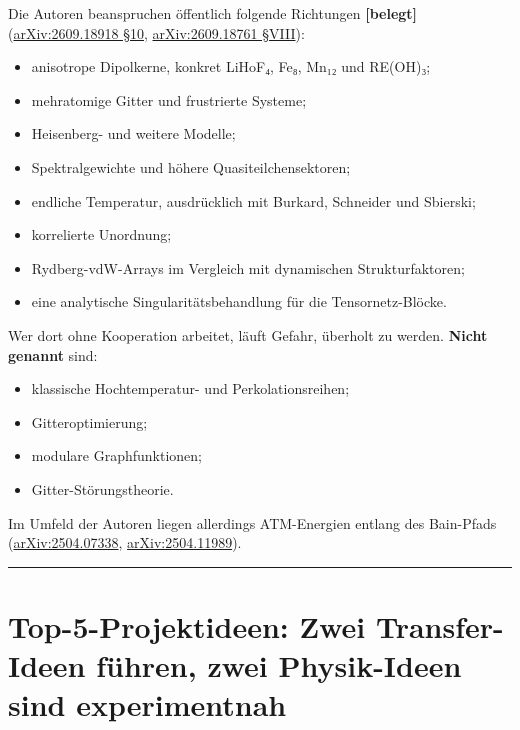 Die Autoren beanspruchen öffentlich folgende Richtungen \textbf{{[}belegt{]}} (\href{https://arxiv.org/html/2609.18918}{arXiv:2609.18918 §10}, \href{https://arxiv.org/html/2609.18761}{arXiv:2609.18761 §VIII}):

\begin{itemize}
\tightlist
\item
  anisotrope Dipolkerne, konkret LiHoF₄, Fe₈, Mn₁₂ und RE(OH)₃;
\item
  mehratomige Gitter und frustrierte Systeme;
\item
  Heisenberg- und weitere Modelle;
\item
  Spektralgewichte und höhere Quasiteilchensektoren;
\item
  endliche Temperatur, ausdrücklich mit Burkard, Schneider und Sbierski;
\item
  korrelierte Unordnung;
\item
  Rydberg-vdW-Arrays im Vergleich mit dynamischen Strukturfaktoren;
\item
  eine analytische Singularitätsbehandlung für die Tensornetz-Blöcke.
\end{itemize}

Wer dort ohne Kooperation arbeitet, läuft Gefahr, überholt zu werden. \textbf{Nicht genannt} sind:

\begin{itemize}
\tightlist
\item
  klassische Hochtemperatur- und Perkolationsreihen;
\item
  Gitteroptimierung;
\item
  modulare Graphfunktionen;
\item
  Gitter-Störungstheorie.
\end{itemize}

Im Umfeld der Autoren liegen allerdings ATM-Energien entlang des Bain-Pfads (\href{https://arxiv.org/abs/2504.07338}{arXiv:2504.07338}, \href{https://arxiv.org/abs/2504.11989}{arXiv:2504.11989}).

\begin{center}\rule{0.5\linewidth}{0.5pt}\end{center}

\section{Top-5-Projektideen: Zwei Transfer-Ideen führen, zwei Physik-Ideen sind experimentnah}

